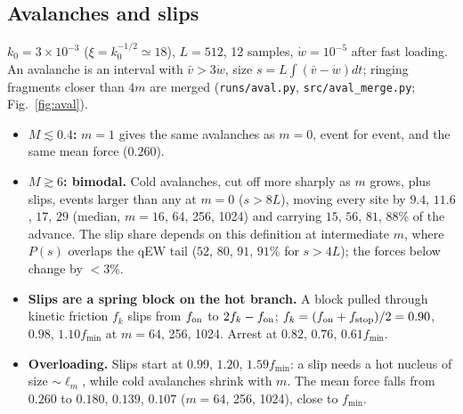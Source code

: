\documentclass[10pt,a4paper]{article}
\begin{document}
\subsection{Avalanches and slips}
\label{sec:aval}

$k_0=3\times10^{-3}$ ($\xi=k_0^{-1/2}\simeq18$), $L=512$, 12 samples, $\dot w=10^{-5}$ after fast loading. An avalanche is an interval with $\bar v>3\dot w$, size $s=L\int(\bar v-\dot w)dt$; ringing fragments closer than $4m$ are merged (\texttt{runs/aval.py}, \texttt{src/aval\_merge.py}; Fig.~\ref{fig:aval}).
\begin{itemize}
\item \textbf{$M\lesssim0.4$:} $m=1$ gives the same avalanches as $m=0$, event for event, and the same mean force ($0.260$).
\item \textbf{$M\gtrsim6$: bimodal.} Cold avalanches, cut off more sharply as $m$ grows, plus slips, events larger than any at $m=0$ ($s>8L$), moving every site by $9.4$, $11.6$, $17$, $29$ (median, $m=16$, 64, 256, 1024) and carrying $15$, $56$, $81$, $88\%$ of the advance. The slip share depends on this definition at intermediate $m$, where $P(s)$ overlaps the qEW tail ($52$, $80$, $91$, $91\%$ for $s>4L$); the forces below change by $<3\%$.
\item \textbf{Slips are a spring block on the hot branch.} A block pulled through kinetic friction $f_k$ slips from $f_{\rm on}$ to $2f_k-f_{\rm on}$; $f_k=(f_{\rm on}+f_{\rm stop})/2=0.90$, $0.98$, $1.10f_{\min}$ at $m=64$, 256, 1024. Arrest at $0.82$, $0.76$, $0.61f_{\min}$.
\item \textbf{Overloading.} Slips start at $0.99$, $1.20$, $1.59f_{\min}$: a slip needs a hot nucleus of size $\sim\ell_m$, while cold avalanches shrink with $m$. The mean force falls from $0.260$ to $0.180$, $0.139$, $0.107$ ($m=64$, 256, 1024), close to $f_{\min}$.
\end{itemize}
\end{document}
